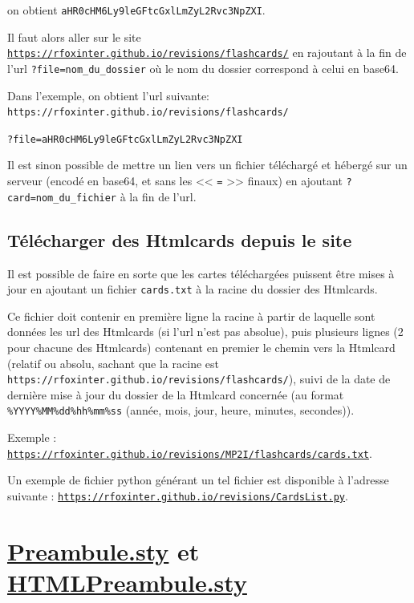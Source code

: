 \documentclass[a4paper,12pt]{article}
\let\oldsection\section
\newcommand{\ssection}[2][]{\clearpage\oldsection[#1]{#2}}
\begin{document}
on obtient \texttt{aHR0cHM6Ly9leGFtcGxlLmZyL2Rvc3NpZXI}.

Il faut alors aller sur le site \href{https://rfoxinter.github.io/revisions/flashcards/}{\texttt{https://rfoxinter.github.io/revisions/flashcards/}} en rajoutant à la fin de l'url \texttt{?file=nom\_du\_dossier} où le nom du dossier correspond à celui en base64.

Dans l'exemple, on obtient l'url suivante:\\\texttt{https://rfoxinter.github.io/revisions/flashcards/}

\hfill\texttt{?file=aHR0cHM6Ly9leGFtcGxlLmZyL2Rvc3NpZXI}

Il est sinon possible de mettre un lien vers un fichier téléchargé et hébergé sur un serveur (encodé en base64, et sans les << \texttt{=} >> finaux) en ajoutant \texttt{?card=nom\_du\_fichier} à la fin de l'url.
\subsection{Télécharger des Htmlcards depuis le site}
Il est possible de faire en sorte que les cartes téléchargées puissent être mises à jour en ajoutant un fichier \texttt{cards.txt} à la racine du dossier des Htmlcards.

Ce fichier doit contenir en première ligne la racine à partir de laquelle sont données les url des Htmlcards (si l'url n'est pas absolue), puis plusieurs lignes (2 pour chacune des Htmlcards) contenant en premier le chemin vers la Htmlcard (relatif ou absolu, sachant que la racine est \texttt{https://rfoxinter.github.io/revisions/flashcards/}), suivi de la date de dernière mise à jour du dossier de la Htmlcard concernée (au format \texttt{\%YYYY\%MM\%dd\%hh\%mm\%ss} (année, mois, jour, heure, minutes, secondes)).

Exemple : \href{https://rfoxinter.github.io/revisions/MP2I/flashcards/cards.txt}{\texttt{https://rfoxinter.github.io/revisions/MP2I/flashcards/cards.txt}}.

Un exemple de fichier python générant un tel fichier est disponible à l'adresse suivante : \href{https://rfoxinter.github.io/revisions/CardsList.py}{\texttt{https://rfoxinter.github.io/revisions/CardsList.py}}.
\ssection[Preambule.sty et HTMLPreambule.sty]{\href{https://rfoxinter.github.io/revisions/output/Preambule.sty}{\color{black}Preambule.sty} et \href{https://rfoxinter.github.io/revisions/output/HTMLPreambule.sty}{\color{black}HTMLPreambule.sty}}
\end{document}
